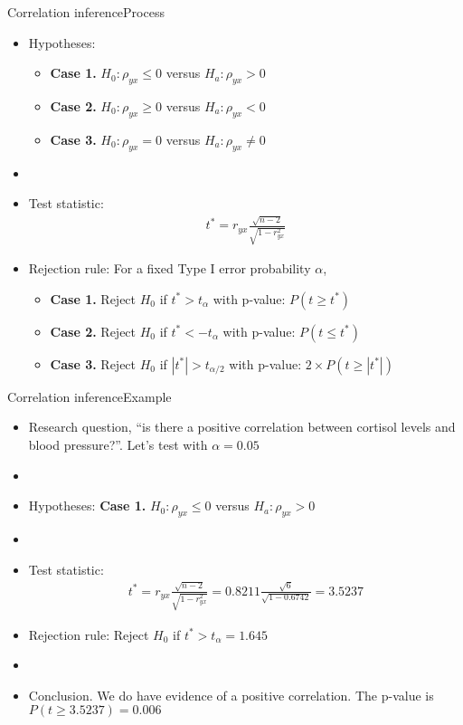 \documentclass[xcolor=dvipsnames]{beamer}
\begin{document}
\begin{frame}{Correlation inference}{Process}
	\begin{itemize}
	\item Hypotheses: 
	\begin{itemize}
		\item \textbf{Case 1.} $H_0: \rho_{yx} \leq 0$ versus $H_a: \rho_{yx} > 0$
		\item \textbf{Case 2.} $H_0: \rho_{yx} \geq 0$ versus $H_a: \rho_{yx} < 0$
		\item \textbf{Case 3.} $H_0: \rho_{yx} = 0$ versus $H_a: \rho_{yx} \neq 0$
	\end{itemize}
	\item[]
	\item Test statistic:
	\begin{gather*}
	t^* = r_{yx} \frac{\sqrt{n-2}}{\sqrt{1-r^2_{yx}}}
	\end{gather*}
	
	\item Rejection rule: For a fixed Type I error probability $\alpha$, 
	\begin{itemize}
		\item \textbf{Case 1.} Reject $H_0$ if $t^* > t_{\alpha}$ with p-value: $P(t\geq t^*)$
		\item \textbf{Case 2.} Reject $H_0$ if $t^* < -t_{\alpha}$ with p-value: $P(t\leq t^*)$
		\item \textbf{Case 3.} Reject $H_0$ if $|t^*| > t_{\alpha / 2}$ with p-value: $2\times P(t\geq |t^*|)$
	\end{itemize}
	\end{itemize}
\end{frame}

\begin{frame}{Correlation inference}{Example}
	\begin{itemize}
		\item Research question, ``is there a positive correlation between cortisol levels and blood pressure?''. Let's test with $\alpha = 0.05$
		\item[]
		\item Hypotheses: \textbf{Case 1.} $H_0: \rho_{yx} \leq 0$ versus $H_a: \rho_{yx} > 0$
		\item[]
		\item Test statistic:
		\begin{gather*}
		t^* = r_{yx} \frac{\sqrt{n-2}}{\sqrt{1-r^2_{yx}}} = 0.8211 \frac{\sqrt{6}}{\sqrt{1-0.6742}} = 3.5237
		\end{gather*}
		
		\item Rejection rule: Reject $H_0$ if $t^* > t_{\alpha} = 1.645$
		\item[]
		\item Conclusion. We do have evidence of a positive correlation. The p-value is $P(t\geq 3.5237)=0.006$
	\end{itemize}
\end{frame}
\end{document}

